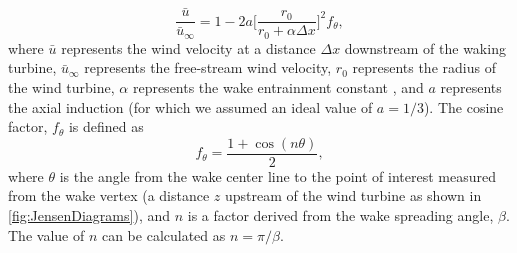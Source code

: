 \documentclass[hidelinks,sort&compress,AMA,STIX1COL]{WileyNJD-v2}
\begin{document}
\begin{equation}
\frac{ \bar{u}}{\bar{u}_\infty} = 1 - 2a \bigg[\frac{r_0}{r_0 + \alpha \Delta x} \bigg]^2 f_\theta,
\label{eq:JensenVelocityDeficit}
\end{equation}
%
where $\bar{u}$ represents the wind velocity at a distance $\Delta x$ downstream of the waking turbine, $\bar{u}_\infty$ represents the free-stream wind velocity, $r_0$ represents the radius of the wind turbine, $\alpha$ represents the wake entrainment constant \cite{jensen1983}, and $a$ represents the axial induction (for which we assumed an ideal value of $a = 1/3$). The cosine factor, $f_\theta$ is defined as
%
\begin{equation}
f_\theta = \frac{1 + \cos{(n\theta)}}{2},
\label{eq:JensenCosineAdjustment}
\end{equation}
%
where $\theta$ is the angle from the wake center line to the point of interest measured from the wake vertex (a distance $z$ upstream of the wind turbine as shown in \cref{fig:JensenDiagrams}), and $n$ is a factor derived from the wake spreading angle, $\beta$. The value of $n$ can be calculated as $n = \pi/\beta$.
\end{document}

